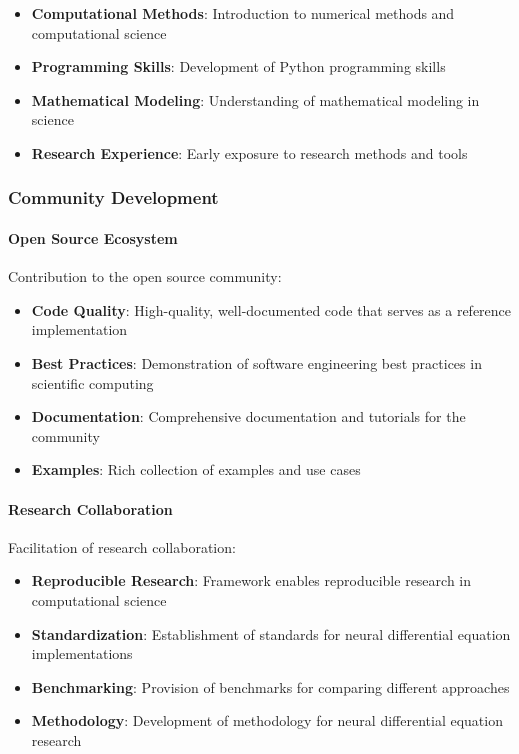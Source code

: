 \begin{itemize}
    \item \textbf{Computational Methods}: Introduction to numerical methods and computational science
    \item \textbf{Programming Skills}: Development of Python programming skills
    \item \textbf{Mathematical Modeling}: Understanding of mathematical modeling in science
    \item \textbf{Research Experience}: Early exposure to research methods and tools
\end{itemize}

\subsubsection{Community Development}

\paragraph{Open Source Ecosystem}
Contribution to the open source community:

\begin{itemize}
    \item \textbf{Code Quality}: High-quality, well-documented code that serves as a reference implementation
    \item \textbf{Best Practices}: Demonstration of software engineering best practices in scientific computing
    \item \textbf{Documentation}: Comprehensive documentation and tutorials for the community
    \item \textbf{Examples}: Rich collection of examples and use cases
\end{itemize}

\paragraph{Research Collaboration}
Facilitation of research collaboration:

\begin{itemize}
    \item \textbf{Reproducible Research}: Framework enables reproducible research in computational science
    \item \textbf{Standardization}: Establishment of standards for neural differential equation implementations
    \item \textbf{Benchmarking}: Provision of benchmarks for comparing different approaches
    \item \textbf{Methodology}: Development of methodology for neural differential equation research
\end{itemize}

